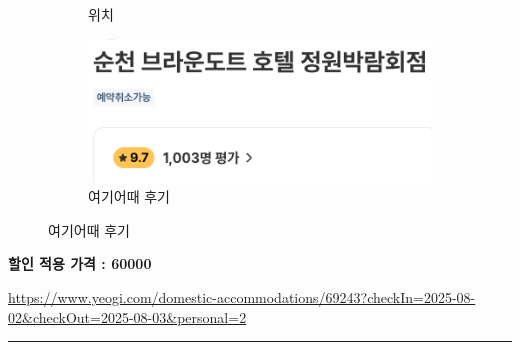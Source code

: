 \documentclass[10pt]{article}
\begin{document}
\begin{figure}[htbp]
\begin{subfigure}{0.3\textwidth}
    \caption{위치}
    \label{fig:2}
  \end{subfigure}
  \hfill
  \begin{subfigure}{0.3\textwidth}
    \centering
    \includegraphics[width=\linewidth]{fig/4_후기.png}
    \caption{여기어때 후기}
    \label{fig:3}
  \end{subfigure}
  \label{fig:three}
\end{figure}
\begin{center}
\textbf{할인 적용 가격 : 60000}
\end{center}
\url{https://www.yeogi.com/domestic-accommodations/69243?checkIn=2025-08-02&checkOut=2025-08-03&personal=2}
\bigskip      %
\hrule        %
\bigskip
\end{document}
